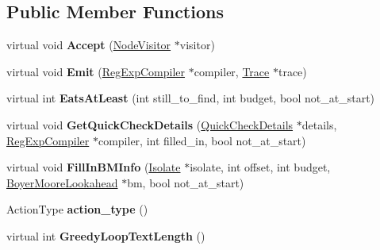 \subsection*{Public Member Functions}
\begin{DoxyCompactItemize}
\item 
virtual void {\bfseries Accept} (\hyperlink{classv8_1_1internal_1_1_node_visitor}{Node\+Visitor} $\ast$visitor)\hypertarget{classv8_1_1internal_1_1_action_node_acd110b20896658ef66be07589828c835}{}\label{classv8_1_1internal_1_1_action_node_acd110b20896658ef66be07589828c835}

\item 
virtual void {\bfseries Emit} (\hyperlink{classv8_1_1internal_1_1_reg_exp_compiler}{Reg\+Exp\+Compiler} $\ast$compiler, \hyperlink{classv8_1_1internal_1_1_trace}{Trace} $\ast$trace)\hypertarget{classv8_1_1internal_1_1_action_node_afac185d923c63324c4f18a2f0a23769d}{}\label{classv8_1_1internal_1_1_action_node_afac185d923c63324c4f18a2f0a23769d}

\item 
virtual int {\bfseries Eats\+At\+Least} (int still\+\_\+to\+\_\+find, int budget, bool not\+\_\+at\+\_\+start)\hypertarget{classv8_1_1internal_1_1_action_node_ab36ade74ae2623b654002605bb0c5144}{}\label{classv8_1_1internal_1_1_action_node_ab36ade74ae2623b654002605bb0c5144}

\item 
virtual void {\bfseries Get\+Quick\+Check\+Details} (\hyperlink{classv8_1_1internal_1_1_quick_check_details}{Quick\+Check\+Details} $\ast$details, \hyperlink{classv8_1_1internal_1_1_reg_exp_compiler}{Reg\+Exp\+Compiler} $\ast$compiler, int filled\+\_\+in, bool not\+\_\+at\+\_\+start)\hypertarget{classv8_1_1internal_1_1_action_node_abc51b0f5a4a393425181f6a0583e6b0a}{}\label{classv8_1_1internal_1_1_action_node_abc51b0f5a4a393425181f6a0583e6b0a}

\item 
virtual void {\bfseries Fill\+In\+B\+M\+Info} (\hyperlink{classv8_1_1internal_1_1_isolate}{Isolate} $\ast$isolate, int offset, int budget, \hyperlink{classv8_1_1internal_1_1_boyer_moore_lookahead}{Boyer\+Moore\+Lookahead} $\ast$bm, bool not\+\_\+at\+\_\+start)\hypertarget{classv8_1_1internal_1_1_action_node_a1b606d25338b60303b4219c72e10db46}{}\label{classv8_1_1internal_1_1_action_node_a1b606d25338b60303b4219c72e10db46}

\item 
Action\+Type {\bfseries action\+\_\+type} ()\hypertarget{classv8_1_1internal_1_1_action_node_ae848c71b17d244a67f3f34afe142fac8}{}\label{classv8_1_1internal_1_1_action_node_ae848c71b17d244a67f3f34afe142fac8}

\item 
virtual int {\bfseries Greedy\+Loop\+Text\+Length} ()\hypertarget{classv8_1_1internal_1_1_action_node_a22be07519e46e566272847427d939793}{}\label{classv8_1_1internal_1_1_action_node_a22be07519e46e566272847427d939793}

\end{DoxyCompactItemize}
